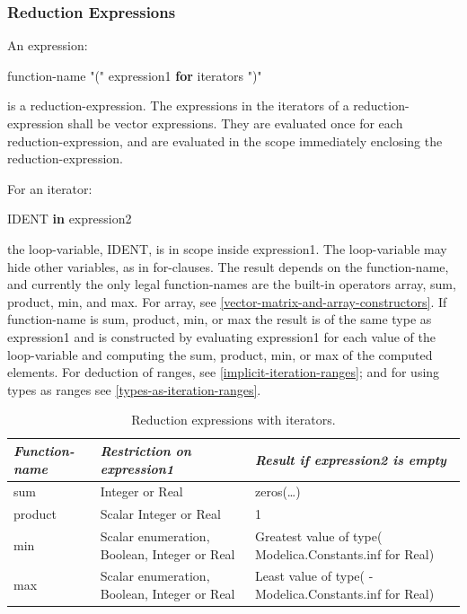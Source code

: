 \documentclass[10pt,a4paper]{report}
\def\doublelabel#1{\label{#1}\hypertarget{#1}{}}
\begin{document}
\subsubsection{Reduction Expressions}\doublelabel{reduction-expressions}

An expression:

function-name "(" expression1 \textbf{for} iterators ")"

is a reduction-expression. The expressions in the iterators of a
reduction-expression shall be vector expressions. They are evaluated
once for each reduction-expression, and are evaluated in the scope
immediately enclosing the reduction-expression.

For an iterator:

IDENT \textbf{in} expression2

the loop-variable, IDENT, is in scope inside expression1. The
loop-variable may hide other variables, as in for-clauses. The result
depends on the function-name, and currently the only legal
function-names are the built-in operators array, sum, product, min, and
max. For array, see \ref{vector-matrix-and-array-constructors}. If function-name is sum, product, min,
or max the result is of the same type as expression1 and is constructed
by evaluating expression1 for each value of the loop-variable and
computing the sum, product, min, or max of the computed elements. For
deduction of ranges, see \ref{implicit-iteration-ranges}; and for using types as ranges
see \ref{types-as-iteration-ranges}.


\begin{longtable}{|p{3cm}|p{4cm}|p{6cm}|}
\caption{Reduction expressions with iterators.}\\
\hline
\emph{Function-name} & \emph{Restriction on expression1} & \emph{Result if expression2 is empty}\\ \hline
\endhead
sum & Integer or Real & zeros(\ldots{})\\ \hline
product & Scalar Integer or Real & 1\\ \hline
min & Scalar enumeration, Boolean, Integer or Real & Greatest value of
type\newline ( Modelica.Constants.inf for Real)\\ \hline
max & Scalar enumeration, Boolean, Integer or Real &
Least value of type\newline ( -Modelica.Constants.inf for Real)\\ \hline

\end{longtable}
\end{document}
